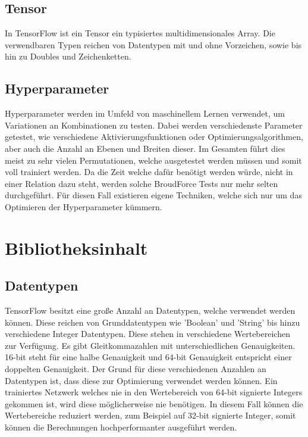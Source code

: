 \subsection{Tensor}

In TensorFlow ist ein Tensor ein typisiertes multidimensionales Array. 
Die verwendbaren Typen reichen von Datentypen mit und ohne Vorzeichen, sowie bis hin zu Doubles und Zeichenketten. \cite{wp2015tensorflow} 

\subsection{Hyperparameter} 

Hyperparameter werden im Umfeld von maschinellem Lernen verwendet, um Variationen an Kombinationen zu testen. 
Dabei werden verschiedenste Parameter getestet, wie verschiedene Aktivierungsfunktionen oder Optimierungsalgorithmen, aber auch die Anzahl an Ebenen und Breiten dieser. 
Im Gesamten führt dies meist zu sehr vielen Permutationen, welche ausgetestet werden müssen und somit voll trainiert werden. 
Da die Zeit welche dafür benötigt werden würde, nicht in einer Relation dazu steht, werden solche BroudForce Tests nur mehr selten durchgeführt. 
Für diesen Fall existieren eigene Techniken, welche sich nur um das Optimieren der Hyperparameter kümmern. \cite{bishop2006pattern}

\section{Bibliotheksinhalt}

\subsection{Datentypen}

TensorFlow besitzt eine große Anzahl an Datentypen, welche verwendet werden können. 
Diese reichen von Grunddatentypen wie 'Boolean' und 'String' bis hinzu verschiedene Integer Datentypen. 
Diese stehen in verschiedene Wertebereichen zur Verfügung. 
Es gibt Gleitkommazahlen mit unterschiedlichen Genauigkeiten. 16-bit steht für eine halbe Genauigkeit und 64-bit Genauigkeit entspricht einer doppelten Genauigkeit.
Der Grund für diese verschiedenen Anzahlen an Datentypen ist, dass diese zur Optimierung verwendet werden können. 
Ein trainiertes Netzwerk welches nie in den Wertebereich von 64-bit signierte Integers gekommen ist, wird diese möglicherweise nie benötigen. 
In diesem Fall können die Wertebereiche reduziert werden, zum Beispiel auf 32-bit signierte Integer, somit können die Berechnungen hochperformanter ausgeführt werden. \cite{TensorFlow}

